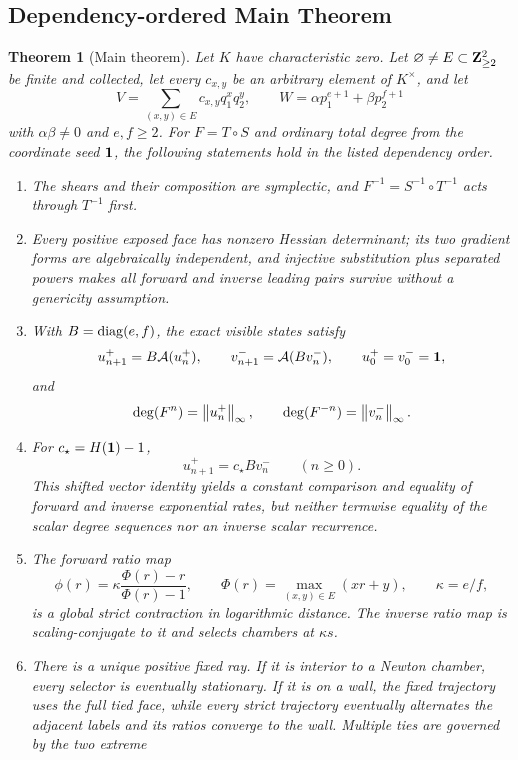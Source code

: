 \documentclass[11pt]{article}
\newtheorem{theorem}{Theorem}[section]
\theoremstyle{definition}
\theoremstyle{remark}
\begin{document}
\subsection{Dependency-ordered Main Theorem}

\begin{theorem}[Main theorem]\label{thm:main}
Let \(K\) have characteristic zero.  Let
\(\varnothing\neq E\subset\mathbf{Z}_{\geq2}^2\) be finite and collected, let
every \(c_{x,y}\) be an arbitrary element of \(K^\times\), and let
\[
V=\sum_{(x,y)\in E}c_{x,y}q_1^xq_2^y,\qquad
W=\alpha p_1^{e+1}+\beta p_2^{f+1}
\]
with \(\alpha\beta\neq0\) and \(e,f\geq2\).  For \(F=T\circ S\) and
ordinary total degree from the coordinate seed \(\mathbf{1}\), the following
statements hold in the listed dependency order.

\begin{enumerate}
\item The shears and their composition are symplectic, and
\(F^{-1}=S^{-1}\circ T^{-1}\) acts through \(T^{-1}\) first.
\item Every positive exposed face has nonzero Hessian determinant; its
two gradient forms are algebraically independent, and injective
substitution plus separated powers makes all forward and inverse leading
pairs survive without a genericity assumption.
\item With \(B=\operatorname{diag}(e,f)\), the exact visible states satisfy
\[
u^+_{n+1}=B\mathcal{A}(u^+_n),\qquad
v^-_{n+1}=\mathcal{A}(Bv^-_n),\qquad u^+_0=v^-_0=\mathbf{1},
\]
and
\[
\deg(F^n)=\left\lVert u^+_n\right\rVert_{\infty},\qquad
\deg(F^{-n})=\left\lVert v^-_n\right\rVert_{\infty}.
\]
\item For \(c_\star=H(\mathbf{1})-1\),
\[
u^+_{n+1}=c_\star Bv^-_n\qquad(n\geq0).
\]
This shifted vector identity yields a constant comparison and equality of
forward and inverse exponential rates, but neither termwise equality of
the scalar degree sequences nor an inverse scalar recurrence.
\item The forward ratio map
\[
\phi(r)=\kappa\frac{\Phi(r)-r}{\Phi(r)-1},\qquad
\Phi(r)=\max_{(x,y)\in E}(xr+y),\qquad\kappa=e/f,
\]
is a global strict contraction in logarithmic distance.  The inverse
ratio map is scaling-conjugate to it and selects chambers at
\(\kappa s\).
\item There is a unique positive fixed ray.  If it is interior to a
Newton chamber, every selector is eventually stationary.  If it is on a
wall, the fixed trajectory uses the full tied face, while every strict
trajectory eventually alternates the adjacent labels and its ratios
converge to the wall.  Multiple ties are governed by the two extreme

\end{enumerate}
\end{theorem}
\end{document}
